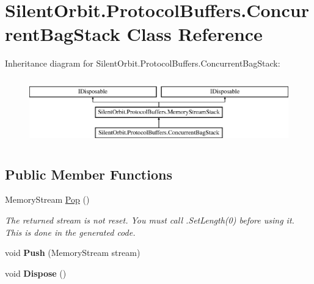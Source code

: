 \hypertarget{class_silent_orbit_1_1_protocol_buffers_1_1_concurrent_bag_stack}{}\section{Silent\+Orbit.\+Protocol\+Buffers.\+Concurrent\+Bag\+Stack Class Reference}
\label{class_silent_orbit_1_1_protocol_buffers_1_1_concurrent_bag_stack}
Inheritance diagram for Silent\+Orbit.\+Protocol\+Buffers.\+Concurrent\+Bag\+Stack\+:\begin{figure}[H]
\begin{center}
\leavevmode
\includegraphics[height=2.876712cm]{class_silent_orbit_1_1_protocol_buffers_1_1_concurrent_bag_stack}
\end{center}
\end{figure}
\subsection*{Public Member Functions}
\begin{DoxyCompactItemize}
\item 
Memory\+Stream \hyperlink{class_silent_orbit_1_1_protocol_buffers_1_1_concurrent_bag_stack_adb6ba4bd478a1e11e135cbbe7676ce1d}{Pop} ()
\begin{DoxyCompactList}\small\item\em The returned stream is not reset. You must call .Set\+Length(0) before using it. This is done in the generated code. \end{DoxyCompactList}\item 
void {\bfseries Push} (Memory\+Stream stream)\hypertarget{class_silent_orbit_1_1_protocol_buffers_1_1_concurrent_bag_stack_ab262efbb9db8f09224f12ef1e98731df}{}\label{class_silent_orbit_1_1_protocol_buffers_1_1_concurrent_bag_stack_ab262efbb9db8f09224f12ef1e98731df}

\item 
void {\bfseries Dispose} ()\hypertarget{class_silent_orbit_1_1_protocol_buffers_1_1_concurrent_bag_stack_aa386d53d821088a236e688f8205b05f8}{}\label{class_silent_orbit_1_1_protocol_buffers_1_1_concurrent_bag_stack_aa386d53d821088a236e688f8205b05f8}

\end{DoxyCompactItemize}


